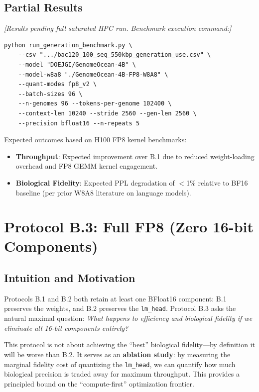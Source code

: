 \documentclass[12pt]{article}
\begin{document}
\subsection{Partial Results}

\textit{[Results pending full saturated HPC run. Benchmark execution command:]}

\begin{verbatim}
python run_generation_benchmark.py \
    --csv ".../bac120_100_seq_550kbp_generation_use.csv" \
    --model "DOEJGI/GenomeOcean-4B" \
    --model-w8a8 "./GenomeOcean-4B-FP8-W8A8" \
    --quant-modes fp8_v2 \
    --batch-sizes 96 \
    --n-genomes 96 --tokens-per-genome 102400 \
    --context-len 10240 --stride 2560 --gen-len 2560 \
    --precision bfloat16 --n-repeats 5
\end{verbatim}

Expected outcomes based on H100 FP8 kernel benchmarks:
\begin{itemize}
    \item \textbf{Throughput}: Expected improvement over B.1 due to reduced weight-loading overhead and FP8 GEMM kernel engagement.
    \item \textbf{Biological Fidelity}: Expected PPL degradation of $<$1\% relative to BF16 baseline (per prior W8A8 literature on language models).
\end{itemize}


\section{Protocol B.3: Full FP8 (Zero 16-bit Components)}

\subsection{Intuition and Motivation}

Protocols B.1 and B.2 both retain at least one BFloat16 component: B.1 preserves the weights, and B.2 preserves the \texttt{lm\_head}. Protocol B.3 asks the natural maximal question: \textit{What happens to efficiency and biological fidelity if we eliminate all 16-bit components entirely?}

This protocol is not about achieving the ``best'' biological fidelity---by definition it will be worse than B.2. It serves as an \textbf{ablation study}: by measuring the marginal fidelity cost of quantizing the \texttt{lm\_head}, we can quantify how much biological precision is traded away for maximum throughput. This provides a principled bound on the ``compute-first'' optimization frontier.
\end{document}

